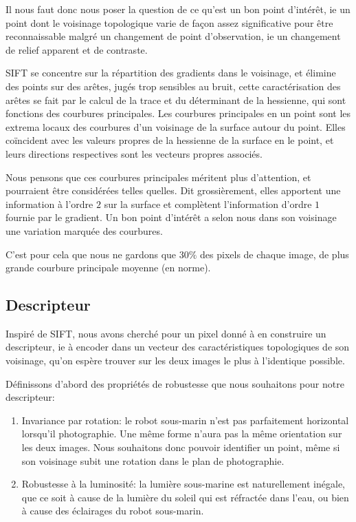 \documentclass[
	a4paper, %
	10pt, %
	unnumberedsections, %
	twoside, %
]{LTJournalArticle}
\begin{document}
Il nous faut donc nous poser la question de ce qu'est un bon point
d'intérêt, ie un point dont le voisinage topologique varie de façon
assez significative pour être reconnaissable malgré un changement de
point d'observation, ie un changement de relief apparent et de contraste.

SIFT se concentre sur la répartition des gradients
dans le voisinage, et élimine des points sur des arêtes, jugés trop
sensibles au bruit, cette caractérisation des arêtes se fait par
le calcul de la trace et du déterminant de la hessienne,
qui sont fonctions des courbures principales.
Les courbures principales en un point sont les extrema locaux des courbures d'un voisinage de la surface
autour du point. Elles
coïncident avec les valeurs propres de la hessienne de la surface en le point,
et leurs directions respectives sont les vecteurs propres associés.

Nous pensons que ces courbures principales méritent plus d'attention,
et pourraient être considérées telles quelles. Dit grossièrement,
elles apportent une information à l'ordre $2$ sur la surface et complètent
l'information d'ordre $1$ fournie par le gradient. Un bon
point d'intérêt a selon nous dans son voisinage une variation marquée des courbures.


C'est pour cela que nous ne gardons que $30 \%$ des pixels de chaque image,
de plus grande courbure principale moyenne (en norme).

\subsection{Descripteur}
Inspiré de SIFT, nous avons cherché pour un pixel donné à en construire un descripteur,
ie à encoder dans un vecteur des caractéristiques topologiques de son voisinage, qu'on espère trouver
sur les deux images le plus à l'identique possible.

Définissons d'abord des propriétés de robustesse
que nous souhaitons pour notre descripteur:

\begin{enumerate}
	\item Invariance par rotation: le robot sous-marin n'est pas parfaitement
	      horizontal lorsqu'il photographie. Une même forme n'aura pas la même
	      orientation sur les deux images. Nous souhaitons donc pouvoir identifier un
	      point, même si son voisinage subit une rotation dans le plan de photographie.
	\item Robustesse à la luminosité: la lumière sous-marine est naturellement inégale,
	      que ce soit à cause de la lumière du soleil qui est réfractée dans l'eau, ou bien à
	      cause des éclairages du robot sous-marin.
\end{enumerate}
\end{document}
